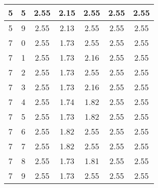 \begin{longtable}{|c|c||c||c|c||c|c|}
	5 & 5 & 2.55 & 2.15 & 2.55 & 2.55 & 2.55 \\ \hline
	5 & 9 & 2.55 & 2.13 & 2.55 & 2.55 & 2.55 \\ \hline
	7 & 0 & 2.55 & 1.73 & 2.55 & 2.55 & 2.55 \\ \hline
	7 & 1 & 2.55 & 1.73 & 2.16 & 2.55 & 2.55 \\ \hline
	7 & 2 & 2.55 & 1.73 & 2.55 & 2.55 & 2.55 \\ \hline
	7 & 3 & 2.55 & 1.73 & 2.16 & 2.55 & 2.55 \\ \hline
	7 & 4 & 2.55 & 1.74 & 1.82 & 2.55 & 2.55 \\ \hline
	7 & 5 & 2.55 & 1.73 & 1.82 & 2.55 & 2.55 \\ \hline
	7 & 6 & 2.55 & 1.82 & 2.55 & 2.55 & 2.55 \\ \hline
	7 & 7 & 2.55 & 1.82 & 2.55 & 2.55 & 2.55 \\ \hline
	7 & 8 & 2.55 & 1.73 & 1.81 & 2.55 & 2.55 \\ \hline
	7 & 9 & 2.55 & 1.73 & 2.55 & 2.55 & 2.55 \\ \hline
\end{longtable}
\clearpage{}
